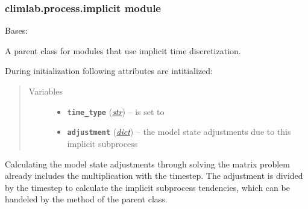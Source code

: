 \documentclass[letterpaper,10pt,english]{sphinxmanual}
\begin{document}
\subsubsection{climlab.process.implicit module}
\label{api/climlab.process:climlab-process-implicit-module}\label{api/climlab.process:module-climlab.process.implicit}

\begin{fulllineitems}
\label{api/climlab.process:climlab.process.implicit.ImplicitProcess}
Bases: {\hyperref[api/climlab.process:climlab.process.time_dependent_process.TimeDependentProcess]{\emph{}}}

A parent class for modules that use implicit time discretization.

During initialization following attributes are intitialized:
\begin{quote}\begin{description}
\item[{Variables}] \leavevmode\begin{itemize}
\item {} 
\textbf{\texttt{time\_type}} (\href{http://docs.python.org/2.7/library/functions.html\#str}{\emph{str}}) -- is set to 

\item {} 
\textbf{\texttt{adjustment}} (\href{http://docs.python.org/2.7/library/stdtypes.html\#dict}{\emph{dict}}) -- the model state adjustments due to this implicit 
subprocess

\end{itemize}

\end{description}\end{quote}

Calculating the model state adjustments through solving the matrix problem 
already includes the multiplication with the timestep. The adjustment is
divided by the timestep to calculate the implicit subprocess tendencies,
which can be handeled by the 
{\hyperref[api/climlab.process:climlab.process.time_dependent_process.TimeDependentProcess.compute]{\emph{}}}
method of the parent 
{\hyperref[api/climlab.process:climlab.process.time_dependent_process.TimeDependentProcess]{\emph{}}} class.

\end{fulllineitems}
\end{document}
